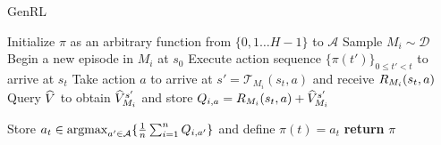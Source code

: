 \documentclass[11pt,twoside]{article}
\begin{document}
\begin{algorithm}
\caption{GenRL}
\label{alg:main}
\begin{algorithmic}[1]
\STATE {}
\STATE Initialize $\pi$ as an arbitrary function from $\{ 0, 1 \dots H - 1 \}$ to $\mathcal{A}$
\STATE Sample $M_i \sim \mathcal{D}$
\STATE Begin a new episode in $M_i$ at $s_0$
\STATE Execute action sequence $\{ \pi(t') \}_{0 \leq t' < t}$ to arrive at $s_t$
\ENDIF
\STATE Take action $a$ to arrive at $s' = \mathcal{T}_{M_i}(s_t, a)$ and receive $R_{M_i}(s_t, a)$
\STATE Query $\widehat{V}$ to obtain $\widehat{V}^{{s' }}_{{M_i }}$ and store $Q_{i, a} = R_{M_i}(s_t, a) + \widehat{V}^{{s' }}_{{M_i }}$
\ENDFOR
\ENDFOR

\STATE Store $a_t \in \operatorname*{argmax}_{a' \in \operatorname{\mathcal{A}}} \{ \frac{1}{n} \sum_{i=1}^n Q_{i, a'} \}$ and define $\pi(t) = a_t$
\ENDFOR
\STATE \textbf{return } $\pi$
\end{algorithmic}
\end{algorithm}
\end{document}
